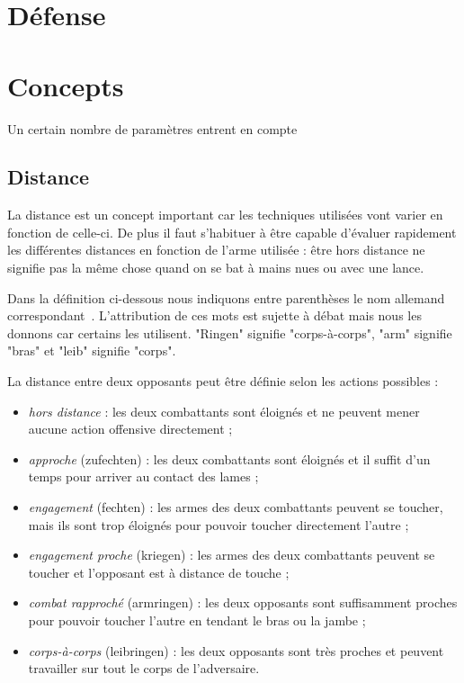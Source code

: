 \section{Défense}




\section{Concepts}


Un certain nombre de paramètres entrent en compte



\subsection{Distance}


La distance est un concept important car les techniques utilisées vont varier en fonction de celle-ci.
De plus il faut s'habituer à être capable d'évaluer rapidement les différentes distances en fonction de l'arme utilisée : être hors distance ne signifie pas la même chose quand on se bat à mains nues ou avec une lance.

Dans la définition ci-dessous nous indiquons entre parenthèses le nom allemand correspondant~\cite{kronenburg:dijon:going_distance:2015}.
L'attribution de ces mots est sujette à débat mais nous les donnons car certains les utilisent.
"Ringen" signifie "corps-à-corps", "arm" signifie "bras" et "leib" signifie "corps".

\begin{definition}[Distances]

\noindent
La distance entre deux opposants peut être définie selon les actions possibles :
\begin{itemize}
	\item \emph{hors distance} : les deux combattants sont éloignés et ne peuvent mener aucune action offensive directement ;
	
	\item \emph{approche} (zufechten) : les deux combattants sont éloignés et il suffit d'un temps pour arriver au contact des lames ;
	
	\item \emph{engagement} (fechten) : les armes des deux combattants peuvent se toucher, mais ils sont trop éloignés pour pouvoir toucher directement l'autre ;
	
	\item \emph{engagement proche} (kriegen) : les armes des deux combattants peuvent se toucher et l'opposant est à distance de touche ;
	
	\item \emph{combat rapproché} (armringen) : les deux opposants sont suffisamment proches pour pouvoir toucher l'autre en tendant le bras ou la jambe ;
	
	\item \emph{corps-à-corps} (leibringen) : les deux opposants sont très proches et peuvent travailler sur tout le corps de l'adversaire.
\end{itemize}
\end{definition}


